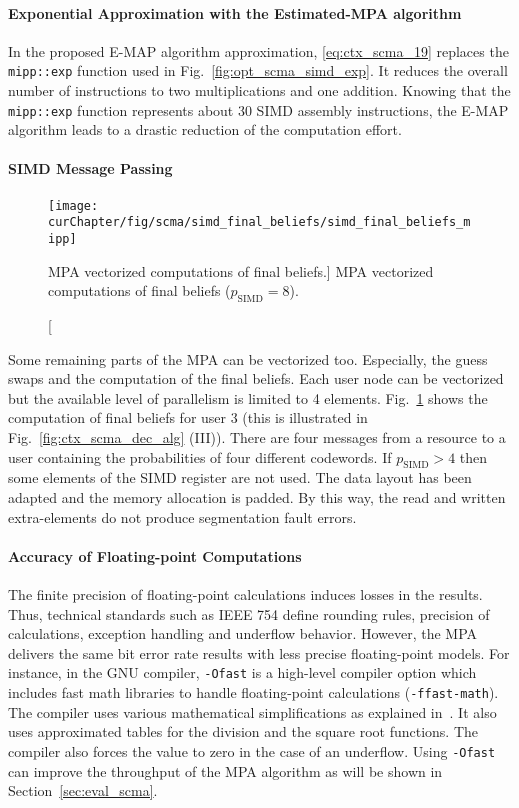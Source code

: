\paragraph{Exponential Approximation with the Estimated-MPA algorithm}

In the proposed E-MAP algorithm approximation, \eqref{eq:ctx_scma_19} replaces
the \verb|mipp::exp| function used in Fig.~\ref{fig:opt_scma_simd_exp}. It
reduces the overall number of instructions to two multiplications and one
addition. Knowing that the \verb|mipp::exp| function represents about 30 SIMD
assembly instructions, the E-MAP algorithm leads to a drastic reduction of the
computation effort.

\paragraph{SIMD Message Passing}

\begin{figure}[htp]
  \centering
  \texttt{[image: \\curChapter/fig/scma/simd\_final\_beliefs/simd\_final\_beliefs\_mipp]}
  \caption
    [MPA vectorized computations of final beliefs.]
    {MPA vectorized computations of final beliefs ($p_\text{SIMD} = 8$).}
  \label{fig:opt_scma_simd_final_guess}
\end{figure}

Some remaining parts of the MPA can be vectorized too. Especially, the guess
swaps and the computation of the final beliefs. Each user node can be
vectorized but the available level of parallelism is limited to 4 elements.
Fig.~\ref{fig:opt_scma_simd_final_guess} shows the computation of final beliefs
for user 3 (this is illustrated in Fig.~\ref{fig:ctx_scma_dec_alg} (III)).
There are four messages from a resource to a user containing the probabilities
of four different codewords. If $p_\text{SIMD} > 4$ then some elements of the
SIMD register are not used. The data layout has been adapted and the memory
allocation is padded. By this way, the read and written extra-elements do not
produce segmentation fault errors.

\newpage
\paragraph{Accuracy of Floating-point Computations}
\label{sec:opt_scma_float}

The finite precision of floating-point calculations induces losses in the
results. Thus, technical standards such as IEEE 754 define rounding rules,
precision of calculations, exception handling and underflow behavior. However,
the MPA delivers the same bit error rate results with less precise
floating-point models. For instance, in the GNU compiler, \verb|-Ofast| is a
high-level compiler option which includes fast math libraries to handle
floating-point calculations (\verb|-ffast-math|). The compiler uses various
mathematical simplifications as explained in~\cite{Gccfp2018}. It also uses
approximated tables for the division and the square root functions. The compiler
also forces the value to zero in the case of an underflow. Using \verb|-Ofast|
can improve the throughput of the MPA algorithm as will be shown in
Section~\ref{sec:eval_scma}.

